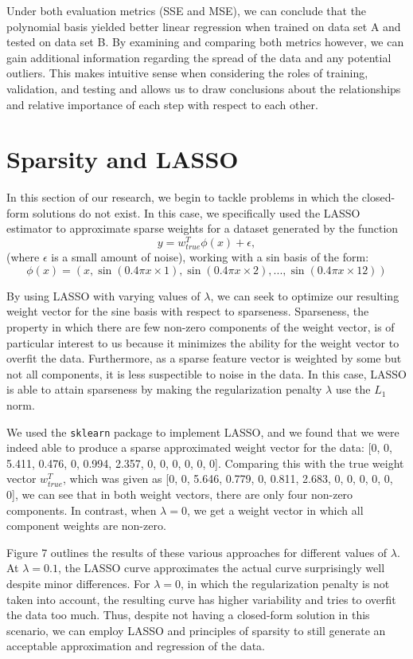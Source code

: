 \documentclass{article}
\begin{document}
Under both evaluation metrics (SSE and MSE), we can conclude that the polynomial basis yielded better linear regression when trained on data set A and tested on data set B. By examining and comparing both metrics however, we can gain additional information regarding the spread of the data and any potential outliers. This makes intuitive sense when considering the roles of training, validation, and testing and allows us to draw conclusions about the relationships and relative importance of each step with respect to each other.

\section{Sparsity and LASSO}
In this section of our research, we begin to tackle problems in which the closed-form solutions do not exist. In this case, we specifically used the LASSO estimator to approximate sparse weights for a dataset generated by the function
$$y = w^{T}_{true}\phi(x)+\epsilon,$$
(where $\epsilon$ is a small amount of noise), working with a sin basis of the form:
$$\phi(x) = (x, \sin(0.4\pi x \times 1), \sin(0.4\pi x \times 2), ... , \sin(0.4\pi x \times 12))$$

By using LASSO with varying values of $\lambda$, we can seek to optimize our resulting weight vector for the sine basis with respect to sparseness. Sparseness, the property in which there are few non-zero components of the weight vector, is of particular interest to us because it minimizes the ability for the weight vector to overfit the data. Furthermore, as a sparse feature vector is weighted by some but not all components, it is less suspectible to noise in the data. In this case, LASSO is able to attain sparseness by making the regularization penalty $\lambda$ use the $L_1$ norm.

We used the \texttt{sklearn} package to implement LASSO, and we found that we were indeed able to produce a sparse approximated weight vector for the data: [0, 0, 5.411, 0.476, 0, 0.994, 2.357, 0, 0, 0, 0, 0, 0]. Comparing this with the true weight vector $w^{T}_{true}$, which was given as [0, 0, 5.646, 0.779, 0, 0.811, 2.683, 0, 0, 0, 0, 0, 0], we can see that in both weight vectors, there are only four non-zero components. In contrast, when $\lambda = 0$, we get a weight vector in which all component weights are non-zero.

Figure 7 outlines the results of these various approaches for different values of $\lambda$. At $\lambda = 0.1$, the LASSO curve approximates the actual curve surprisingly well despite minor differences. For $\lambda = 0$, in which the regularization penalty is not taken into account, the resulting curve has higher variability and tries to overfit the data too much. Thus, despite not having a closed-form solution in this scenario, we can employ LASSO and principles of sparsity to still generate an acceptable approximation and regression of the data.
\end{document}
